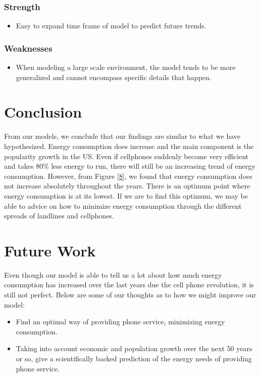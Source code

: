 \documentclass{article}
\begin{document}
\subsubsection{Strength}
\begin{itemize}
    \item Easy to expand time frame of model to predict future trends.
\end{itemize}
\subsubsection{Weaknesses}
\begin{itemize}
    \item When modeling a large scale environment, the model tends to be more generalized and cannot encompass specific details that happen.
\end{itemize} 

\section{Conclusion}
From our models, we conclude that our findings are similar to what we have hypothesized. Energy consumption does increase and the main component is the popularity growth in the US. Even if cellphones suddenly become very efficient and takes 80\% less energy to run, there will still be an increasing trend of energy consumption. However, from Figure \ref{8}, we found that energy consumption does not increase absolutely throughout the years. There is an optimum point where energy consumption is at its lowest. If we are to find this optimum, we may be able to advice on how to minimize energy consumption through the different spreads of landlines and cellphones.



\section{Future Work}
Even though our model is able to tell us a lot about how much energy consumption has increased over the last years due the cell phone revolution, it is still not perfect. Below are some of our thoughts as to how we might improve our model:

\begin{itemize}
    \item 
    Find an optimal way of providing phone service, minimizing energy consumption.
    
    \item 
    Taking into account economic and population growth over the next 50 years or so, give a scientifically backed prediction of the energy needs of providing phone service.
\end{itemize}
\end{document}
